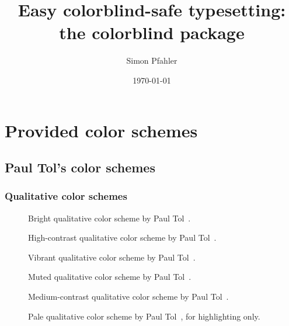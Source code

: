 \documentclass{scrartcl}
\title{Easy colorblind-safe typesetting:\\ the \textbf{colorblind} package}
\author{Simon Pfahler}
\date{\today}
\begin{document}
\maketitle

\section{Provided color schemes}

\subsection{Paul Tol's color schemes}

\subsubsection{Qualitative color schemes}

\begin{figure}[ht]
    \centering
    \caption{Bright qualitative color scheme by Paul Tol~\cite{Tol}.}
    \label{fig:T_Q_B}
\end{figure}

\begin{figure}[ht]
    \centering
    \caption{High-contrast qualitative color scheme by Paul Tol~\cite{Tol}.}
    \label{fig:T_Q_HC}
\end{figure}

\begin{figure}[ht]
    \centering
    \caption{Vibrant qualitative color scheme by Paul Tol~\cite{Tol}.}
    \label{fig:T_Q_V}
\end{figure}

\begin{figure}[ht]
    \centering
    \caption{Muted qualitative color scheme by Paul Tol~\cite{Tol}.}
    \label{fig:T_Q_M}
\end{figure}

\begin{figure}[ht]
    \centering
    \caption{Medium-contrast qualitative color scheme by Paul Tol~\cite{Tol}.}
    \label{fig:T_Q_MC}
\end{figure}

\begin{figure}[ht]
    \centering
    \caption{Pale qualitative color scheme by Paul Tol~\cite{Tol}, for highlighting only.}
    \label{fig:T_Q_PH}
\end{figure}
\end{document}
